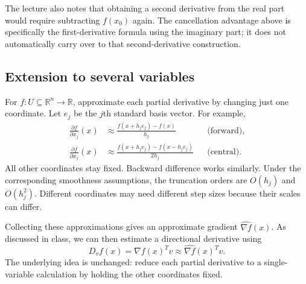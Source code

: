 The lecture also notes that obtaining a second derivative from the real part would require subtracting $f(x_0)$ again. The cancellation advantage above is specifically the first-derivative formula using the imaginary part; it does not automatically carry over to that second-derivative construction.

\subsection{Extension to several variables}
For $f:U\subseteq\mathbb{R}^n\to\mathbb{R}$, approximate each partial derivative by changing just one coordinate. Let $e_j$ be the $j$th standard basis vector. For example,
\begin{align*}
 \frac{\partial f}{\partial x_j}(x)
 &\approx\frac{f(x+h_j e_j)-f(x)}{h_j}
 &&\text{(forward)},\\
 \frac{\partial f}{\partial x_j}(x)
 &\approx\frac{f(x+h_j e_j)-f(x-h_j e_j)}{2h_j}
 &&\text{(central)}.
\end{align*}
All other coordinates stay fixed. Backward difference works similarly. Under the corresponding smoothness assumptions, the truncation orders are $O(h_j)$ and $O(h_j^2)$. Different coordinates may need different step sizes because their scales can differ.

Collecting these approximations gives an approximate gradient $\widehat{\nabla f}(x)$. As discussed in class, we can then estimate a directional derivative using
\[
 D_vf(x)=\nabla f(x)^Tv\approx\widehat{\nabla f}(x)^Tv.
\]
The underlying idea is unchanged: reduce each partial derivative to a single-variable calculation by holding the other coordinates fixed.
